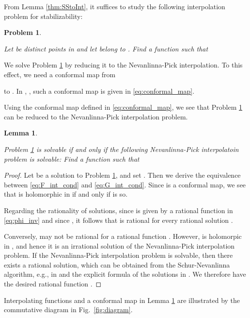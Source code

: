\documentclass[letterpaper, 12pt, draftcls, onecolumn]{ieeeconf}
\newtheorem{problem}[theorem]{Problem}
\newtheorem{lemma}[theorem]{Lemma}
\begin{document}
From Lemma \ref{thm:SStoInt},
it suffices to study the following interpolation problem
for stabilizability:
\begin{problem}
	\label{prob:interpolation}
	{\it
		Let  be distinct points in  and
		let  belong to
		.
		Find a function  such that
		 
}
\end{problem}

We solve Problem \ref{prob:interpolation}
by reducing it to the Nevanlinna-Pick interpolation.
To this effect,
we need a conformal map from 

to .
In \cite{Olbrot1994}, 
\cite[Section 4.1]{foias1996},
such a conformal map  is given in
\eqref{eq:conformal_map}.


Using
the conformal map defined in \eqref{eq:conformal_map},
we see that
Problem \ref{prob:interpolation} can be reduced to
the Nevanlinna-Pick interpolation problem.
\begin{lemma}
	\label{thm:ReductionNPInt}
	{\it
		Problem \ref{prob:interpolation} is solvable if and only if
		the following Nevanlinna-Pick interpolatoin problem is solvable:
		Find a function  
		such that
		
	}
\end{lemma}

\begin{proof}
Let  be a solution to Problem \ref{prob:interpolation}, and
set . Then we derive
the equivalence between \eqref{eq:F_int_cond} and \eqref{eq:G_int_cond}.
Since  is a conformal map,
we see that  is holomorphic in  if and only if
 is so.

Regarding the rationality of solutions, 
since  is given by
a rational function in \eqref{eq:phi_inv}
and since , 
it follows that  is rational for every rational solution .

Conversely,  may not be rational for a
rational function . 
However,  is holomorpic in , 
and hence it is an irrational
solution of
the Nevanlinna-Pick interpolation problem.
If the Nevanlinna-Pick interpolation problem is solvable, 
then there exists a rational solution,
which can be obtained from the Schur-Nevanlinna algorithm, e.g., in
\cite{luxemburg2010, wakaiki2012}
and the explicit formula of the solutions in 
\cite[Sec. 2.11]{foias1996}.
We therefore have the desired rational function .
\end{proof}

Interpolating functions and a conformal map in Lemma \ref{thm:ReductionNPInt} 
are illustrated by the commutative diagram in Fig.~\ref{fig:diagram}.
\end{document}
